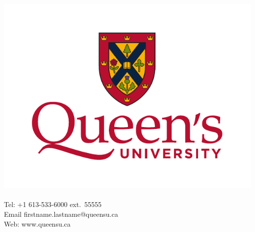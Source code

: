 \documentclass[fleqn]{qu-slides}
\begin{document}
\SlideThemeGrey
\begin{frame}
    \begin{columns}
        \centering
        \includegraphics[width=\textwidth]{logo/qu-logo-vertical-colour.pdf}
        {\large\bf \insertauthor} \\
        \insertinstitute \\
        Tel: +1 613-533-6000 ext.\ 55555 \\
        Email firstname.lastname@queensu.ca \\
        Web: www.queensu.ca
    \end{columns}
\end{frame}

\end{document}
